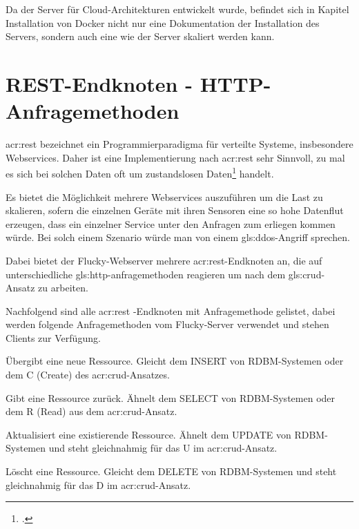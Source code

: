 Da der Server für Cloud-Architekturen entwickelt wurde, befindet sich in Kapitel Installation von Docker nicht nur eine Dokumentation der Installation des Servers, sondern auch eine wie der Server skaliert werden kann.

\section{REST-Endknoten - HTTP-Anfragemethoden}%
\label{sec:rest}
\acrfull{acr:rest} bezeichnet ein Programmierparadigma für verteilte Systeme, insbesondere Webservices. Daher ist eine Implementierung nach \acrshort{acr:rest} sehr Sinnvoll, zu mal es sich bei solchen Daten oft um zustandslosen Daten\footcite{zustandslosigkeit} handelt.

Es bietet die Möglichkeit mehrere Webservices auszuführen um die Last zu skalieren, sofern die einzelnen Geräte mit ihren Sensoren eine so hohe Datenflut erzeugen, dass ein einzelner Service unter den Anfragen zum erliegen kommen würde. Bei solch einem Szenario würde man von einem \Gls{gls:ddos}-Angriff sprechen.

Dabei bietet der Flucky-Webserver mehrere \acrshort{acr:rest}-Endknoten an, die auf unterschiedliche \Gls{gls:http-anfragemethoden} reagieren um nach dem \Gls{gls:crud}-Ansatz zu arbeiten.

Nachfolgend sind alle \acrshort{acr:rest} -Endknoten mit Anfragemethode gelistet, dabei werden folgende Anfragemethoden vom Flucky-Server verwendet und stehen Clients zur Verfügung.

\begin{description}[itemsep=0pt]
  \item[POST] Übergibt eine neue Ressource. Gleicht dem INSERT von RDBM-Systemen oder dem C (Create) des \acrshort{acr:crud}-Ansatzes.
  \item[GET] Gibt eine Ressource zurück. Ähnelt dem SELECT von RDBM-Systemen oder dem R (Read) aus dem \acrshort{acr:crud}-Ansatz.
  \item[PUT] Aktualisiert eine existierende Ressource. Ähnelt dem UPDATE von RDBM-Systemen und steht gleichnahmig für das U im \acrshort{acr:crud}-Ansatz.
  \item[DELETE] Löscht eine Ressource. Gleicht dem DELETE von RDBM-Systemen und steht gleichnahmig für das D im \acrshort{acr:crud}-Ansatz.
\end{description}

